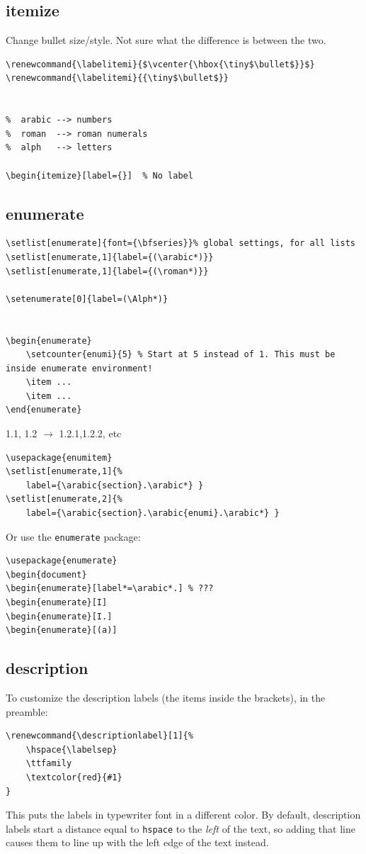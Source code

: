 \documentclass{article}
\renewcommand{\labelitemi}{$\vcenter{\hbox{\tiny$\bullet$}}$}
\renewcommand{\descriptionlabel}[1]{%
    \ttfamily\textcolor{cadet}{#1}
}
\begin{document}
\subsection{itemize}
Change bullet size/style. Not sure what the difference is between the two.
\begin{lstlisting}
\renewcommand{\labelitemi}{$\vcenter{\hbox{\tiny$\bullet$}}$}
\renewcommand{\labelitemi}{{\tiny$\bullet$}}


%  arabic --> numbers
%  roman  --> roman numerals
%  alph   --> letters

\begin{itemize}[label={}]  % No label
\end{lstlisting}

\subsection{enumerate}
\begin{lstlisting}
\setlist[enumerate]{font={\bfseries}}% global settings, for all lists
\setlist[enumerate,1]{label={(\arabic*)}}
\setlist[enumerate,1]{label={(\roman*)}}

\setenumerate[0]{label=(\Alph*)}


\begin{enumerate}
    \setcounter{enumi}{5} % Start at 5 instead of 1. This must be inside enumerate environment!
    \item ...
    \item ...
\end{enumerate}
\end{lstlisting}

1.1, 1.2 $\rightarrow$ 1.2.1,1.2.2, etc
\begin{lstlisting}
\usepackage{enumitem}
\setlist[enumerate,1]{%
    label={\arabic{section}.\arabic*} }
\setlist[enumerate,2]{%
    label={\arabic{section}.\arabic{enumi}.\arabic*} }
\end{lstlisting}
Or use the \texttt{enumerate} package:
\begin{lstlisting}
\usepackage{enumerate}
\begin{document}
\begin{enumerate}[label*=\arabic*.] % ???
\begin{enumerate}[I]
\begin{enumerate}[I.]
\begin{enumerate}[(a)]
\end{lstlisting}

\subsection{description}
To customize the description labels (the items inside the brackets), in the preamble:
\begin{lstlisting}
\renewcommand{\descriptionlabel}[1]{%
    \hspace{\labelsep}
    \ttfamily
    \textcolor{red}{#1}
}
\end{lstlisting}
This puts the labels in typewriter font in a different color.
By default, description labels start a distance equal to
\texttt{hspace} to the \emph{left} of the text, so adding that line
causes them to line up with the left edge of the text instead.
\end{document}

